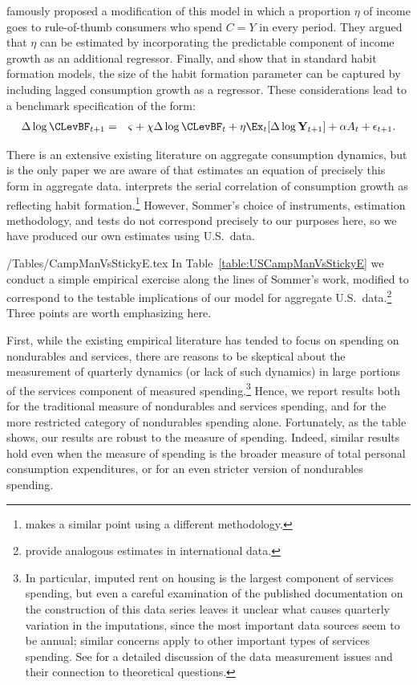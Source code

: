 \documentclass[titlepage]{\econtex}\newcommand{\texname}{cAndCwithStickyE}
\begin{document}
\cite{cmModel} famously proposed a modification of this model in which a proportion $\eta$ of income goes to rule-of-thumb consumers who spend $C=Y$ in every period.  They argued that $\eta$ can be estimated by incorporating the predictable component of income growth as an additional regressor.  Finally, \cite{dynanHabits} and \cite{som07} show that in standard habit formation models, the size of the habit formation parameter can be captured by including lagged consumption growth as a regressor.  These considerations lead to a benchmark specification of the form:
\begin{eqnarray}
  \label{eq:CGrowBench}
  \Delta \log \CLevBF_{t+1} & = & \varsigma+\chi \Delta \log \CLevBF_{t}+\eta \Ex_{t}[\Delta \log \mathbf{Y}_{t+1}]+\alpha A_{t}+\epsilon_{t+1}.
\end{eqnarray}

There is an extensive existing literature on aggregate consumption dynamics, but \cite{som07} is the only paper we are aware of that estimates an equation of precisely this form in aggregate data.  \cite{som07} interprets the serial correlation of consumption growth as reflecting habit formation.\footnote{\cite{weber:ruleofthumb} makes a similar point using a different methodology.}  However, Sommer's choice of instruments, estimation methodology, and tests do not correspond precisely to our purposes here, so we have produced our own estimates using U.S.\ data.

\econtexRoot/Tables/CampManVsStickyE.tex
In Table~\ref{table:USCampManVsStickyE} we conduct a simple empirical exercise along the lines of Sommer's work, modified to correspond to the testable implications of our model for aggregate U.S.\ data.\footnote{\cite{cssIntlStickyC} provide analogous estimates in international data.}  Three points are worth emphasizing here.

First, while the existing empirical literature has tended to focus on spending on nondurables and services, there are reasons to be skeptical about the measurement of quarterly dynamics (or lack of such dynamics) in large portions of the services component of measured spending.\footnote{In particular, imputed rent on housing is the largest component of services spending, but even a careful examination of the published documentation on the construction of this data series leaves it unclear what causes quarterly variation in the imputations, since the most important data sources seem to be annual; similar concerns apply to other important types of services spending.  See \cite{wilcox:aer} for a detailed discussion of the data measurement issues and their connection to theoretical questions.}  Hence, we report results both for the traditional measure of nondurables and services spending, and for the more restricted category of nondurables spending alone.  Fortunately, as the table shows, our results are robust to the measure of spending.  Indeed, similar results hold even when the measure of spending is the broader measure of total personal consumption expenditures, or for an even stricter version of nondurables spending.
\end{document}
